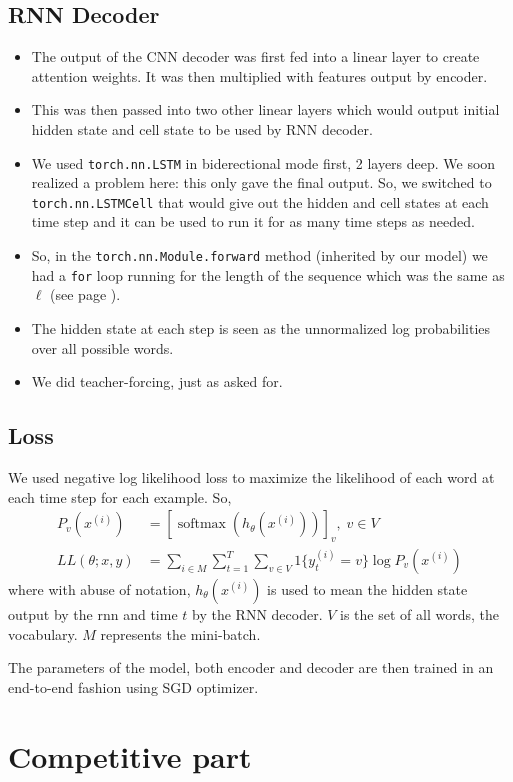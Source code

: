 \documentclass[11pt]{article}
\begin{document}
\subsection{RNN Decoder}
\label{sec-1-3}
\begin{itemize}
\item The output of the CNN decoder was first fed into a linear layer to
create attention weights. It was then multiplied with features
output by encoder.
\item This was then passed into two other linear layers which would output
initial hidden state and cell state to be used by RNN decoder.
\item We used \texttt{torch.nn.LSTM} in biderectional mode first, 2 layers
deep. We soon realized a problem here: this only gave the final
output. So, we switched to \texttt{torch.nn.LSTMCell} that would
give out the hidden and cell states at each time step and it can be
used to run it for as many time steps as needed.
\item So, in the \texttt{torch.nn.Module.forward} method (inherited by our
model) we had a \texttt{for} loop running for the length of the
sequence which was the same as \(\ell\) (see page \pageref{ell}).
\item The hidden state at each step is seen as the unnormalized log
probabilities over all possible words.
\item We did teacher-forcing, just as asked for.
\end{itemize}
\subsection{Loss}
\label{sec-1-4}
We used negative log likelihood loss to maximize the likelihood
of each word at each time step for each example. So,
\begin{align*}
P_v(x^{(i)})&=[\operatorname{softmax}(h_\theta(x^{(i)}))]_v, \; v\in V\\
LL(\theta;x,y)&=\sum_{i\in M}\sum_{t=1}^T\sum_{v\in V} 1\{y^{(i)}_t=v\}\log{P_v(x^{(i)})}
\end{align*}
where with abuse of notation, \(h_\theta(x^{(i)})\) is used to mean
the hidden state output by the rnn and time \(t\) by the RNN
decoder. \(V\) is the set of all words, the vocabulary. \(M\)
represents the mini-batch.\par
The parameters of the model, both encoder and decoder are then trained
in an end-to-end fashion using SGD optimizer.

\section{Competitive part}
\label{sec-2}
\end{document}
